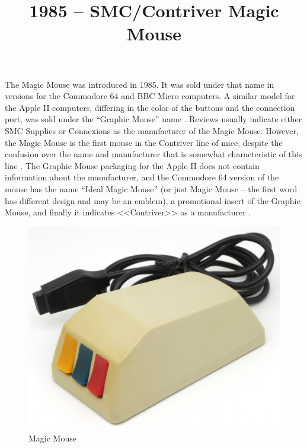 \documentclass[11pt, a4paper]{article}
\begin{document}
\title{1985 -- SMC/Contriver Magic Mouse}
\date{}
\maketitle
{}

The Magic Mouse was introduced in 1985. It was sold under that name in versions for the Commodore 64 and BBC Micro computers. A similar model for the Apple II computers, differing in the color of the buttons and the connection port, was sold under the ``Graphic Mouse'' name \cite{SMC_Mouse_Commodore1}. Reviews usually indicate either SMC Supplies \cite{c64wiki, SMC_Mouse_Commodore3} or Connexions \cite{SMC_Mouse_Commodore2} as the manufacturer of the Magic Mouse. However, the Magic Mouse is the first mouse in the Contriver line of mice, despite the confusion over the name and manufacturer that is somewhat characteristic of this line \cite{reddit}. The Graphic Mouse packaging for the Apple II does not contain information about the manufacturer, and the Commodore 64 version of the mouse has the name ``Ideal Magic Mouse'' (or just Magic Mouse -- the first word has different design and may be an emblem), a promotional insert of the Graphic Mouse, and finally it indicates <<Contriver>> as a manufacturer \cite{CHM}.

\begin{figure}[h]
   \centering
    \includegraphics[scale=0.62]{1985_smc_contriver_magic_mouse/pic_30.jpg}
    \caption{Magic Mouse}
    \label{fig:MagicMousePic}
\end{figure}
\end{document}
